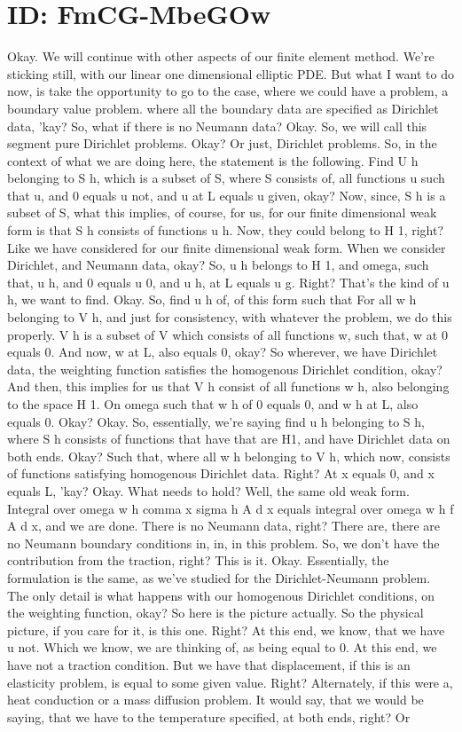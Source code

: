 \documentclass[10pt]{article}
\begin{document}
\section*{ID: FmCG-MbeGOw}
Okay. We will continue with other aspects of our finite element method. We're sticking still, with our linear one dimensional elliptic PDE. But what I want to do now, is take the opportunity to go to the case, where we could have a problem, a boundary value problem. where all the boundary data are specified as Dirichlet data, 'kay? So, what if there is no Neumann data? Okay. So, we will call this segment pure Dirichlet problems. Okay? Or just, Dirichlet problems. So, in the context of what we are doing here, the statement is the following. Find U h belonging to S h, which is a subset of S, where S consists of, all functions u such that u, and 0 equals u not, and u at L equals u given, okay? Now, since, S h is a subset of S, what this implies, of course, for us, for our finite dimensional weak form is that S h consists of functions u h. Now, they could belong to H 1, right? Like we have considered for our finite dimensional weak form. When we consider Dirichlet, and Neumann data, okay? So, u h belongs to H 1, and omega, such that, u h, and 0 equals u 0, and u h, at L equals u g. Right? That's the kind of u h, we want to find. Okay. So, find u h of, of this form such that For all w h belonging to V h, and just for consistency, with whatever the problem, we do this properly. V h is a subset of V which consists of all functions w, such that, w at 0 equals 0. And now, w at L, also equals 0, okay? So wherever, we have Dirichlet data, the weighting function satisfies the homogenous Dirichlet condition, okay? And then, this implies for us that V h consist of all functions w h, also belonging to the space H 1. On omega such that w h of 0 equals 0, and w h at L, also equals 0. Okay? Okay. So, essentially, we're saying find u h belonging to S h, where S h consists of functions that have that are H1, and have Dirichlet data on both ends. Okay? Such that, where all w h belonging to V h, which now, consists of functions satisfying homogenous Dirichlet data. Right? At x equals 0, and x equals L, 'kay? Okay. What needs to hold? Well, the same old weak form. Integral over omega w h comma x sigma h A d x equals integral over omega w h f A d x, and we are done. There is no Neumann data, right? There are, there are no Neumann boundary conditions in, in, in this problem. So, we don't have the contribution from the traction, right? This is it. Okay. Essentially, the formulation is the same, as we've studied for the Dirichlet-Neumann problem. The only detail is what happens with our homogenous Dirichlet conditions, on the weighting function, okay? So here is the picture actually. So the physical picture, if you care for it, is this one. Right? At this end, we know, that we have u not. Which we know, we are thinking of, as being equal to 0. At this end, we have not a traction condition. But we have that displacement, if this is an elasticity problem, is equal to some given value. Right? Alternately, if this were a, heat conduction or a mass diffusion problem. It would say, that we would be saying, that we have to the temperature specified, at both ends, right? Or 
\end{document}
